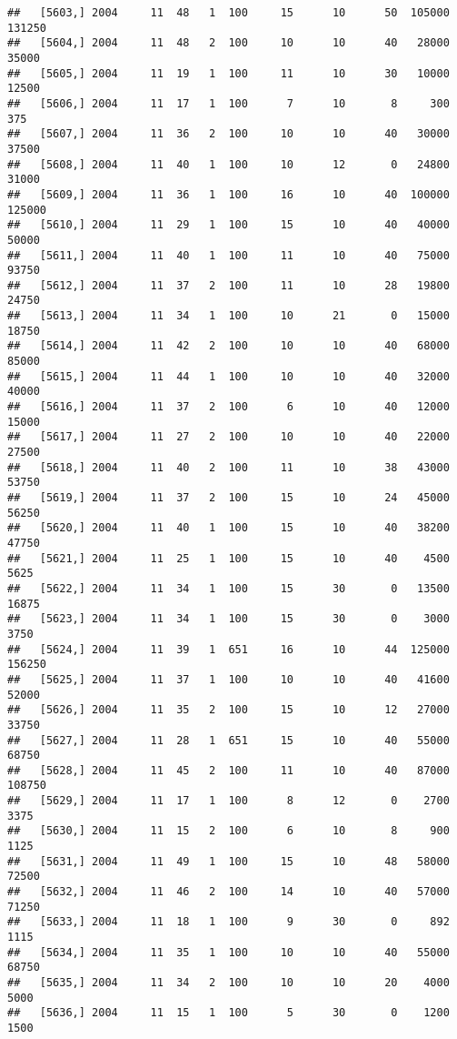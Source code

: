 \documentclass{article}\usepackage[]{graphicx}\usepackage[]{color}
\makeatletter
\newenvironment{kframe}{%
 \def\at@end@of@kframe{}%
 \ifinner\ifhmode%
  \def\at@end@of@kframe{\end{minipage}}%
  \begin{minipage}{\columnwidth}%
 \fi\fi%
 \def\FrameCommand##1{\hskip\@totalleftmargin \hskip-\fboxsep
 \colorbox{shadecolor}{##1}\hskip-\fboxsep
     \hskip-\linewidth \hskip-\@totalleftmargin \hskip\columnwidth}%
 \MakeFramed {\advance\hsize-\width
   \@totalleftmargin\z@ \linewidth\hsize
   \@setminipage}}%
 {\par\unskip\endMakeFramed%
 \at@end@of@kframe}
\newenvironment{knitrout}{}{} %
\makeatother
\begin{document}
\begin{knitrout}
\begin{kframe}
\begin{verbatim}
##   [5603,] 2004     11  48   1  100     15      10      50  105000  131250
##   [5604,] 2004     11  48   2  100     10      10      40   28000   35000
##   [5605,] 2004     11  19   1  100     11      10      30   10000   12500
##   [5606,] 2004     11  17   1  100      7      10       8     300     375
##   [5607,] 2004     11  36   2  100     10      10      40   30000   37500
##   [5608,] 2004     11  40   1  100     10      12       0   24800   31000
##   [5609,] 2004     11  36   1  100     16      10      40  100000  125000
##   [5610,] 2004     11  29   1  100     15      10      40   40000   50000
##   [5611,] 2004     11  40   1  100     11      10      40   75000   93750
##   [5612,] 2004     11  37   2  100     11      10      28   19800   24750
##   [5613,] 2004     11  34   1  100     10      21       0   15000   18750
##   [5614,] 2004     11  42   2  100     10      10      40   68000   85000
##   [5615,] 2004     11  44   1  100     10      10      40   32000   40000
##   [5616,] 2004     11  37   2  100      6      10      40   12000   15000
##   [5617,] 2004     11  27   2  100     10      10      40   22000   27500
##   [5618,] 2004     11  40   2  100     11      10      38   43000   53750
##   [5619,] 2004     11  37   2  100     15      10      24   45000   56250
##   [5620,] 2004     11  40   1  100     15      10      40   38200   47750
##   [5621,] 2004     11  25   1  100     15      10      40    4500    5625
##   [5622,] 2004     11  34   1  100     15      30       0   13500   16875
##   [5623,] 2004     11  34   1  100     15      30       0    3000    3750
##   [5624,] 2004     11  39   1  651     16      10      44  125000  156250
##   [5625,] 2004     11  37   1  100     10      10      40   41600   52000
##   [5626,] 2004     11  35   2  100     15      10      12   27000   33750
##   [5627,] 2004     11  28   1  651     15      10      40   55000   68750
##   [5628,] 2004     11  45   2  100     11      10      40   87000  108750
##   [5629,] 2004     11  17   1  100      8      12       0    2700    3375
##   [5630,] 2004     11  15   2  100      6      10       8     900    1125
##   [5631,] 2004     11  49   1  100     15      10      48   58000   72500
##   [5632,] 2004     11  46   2  100     14      10      40   57000   71250
##   [5633,] 2004     11  18   1  100      9      30       0     892    1115
##   [5634,] 2004     11  35   1  100     10      10      40   55000   68750
##   [5635,] 2004     11  34   2  100     10      10      20    4000    5000
##   [5636,] 2004     11  15   1  100      5      30       0    1200    1500

\end{verbatim}
\end{kframe}
\end{knitrout}
\end{document}

